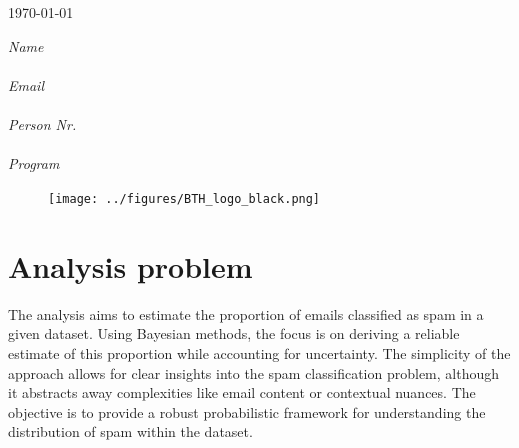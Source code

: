 \documentclass[12pt,a4paper]{article}
\begin{document}
\vspace*{3cm}

\begin{center}
    \Huge\textbf{\doctitle}\\
    \Large\textbf{\docsubtitle}
    \\\vspace*{5mm} 
    \large\today                            
\end{center} 

\vspace*{1cm}
\begin{center}
    \textit{Name}       \\
    \authorname         \\ %
    \vspace*{2mm}
    \textit{Email}      \\
    \authormail         \\ %
    \vspace*{2mm}
    \textit{Person Nr.} \\
    \authorpersonnr     \\ %
    \vspace*{2mm}
    \textit{Program}    \\
    \program               %
\end{center}

\begin{figure}[!b]
    \centering
    \texttt{[image: ../figures/BTH\_logo\_black.png]}
\end{figure}

\newpage

\section{Analysis problem}\label{sec:analysisproblem}

The analysis aims to estimate the proportion of emails classified as spam in a given dataset. Using Bayesian
methods, the focus is on deriving a reliable estimate of this proportion while accounting for uncertainty.
The simplicity of the approach allows for clear insights into the spam classification problem, although it
abstracts away complexities like email content or contextual nuances. The objective is to provide a robust
probabilistic framework for understanding the distribution of spam within the dataset.
\end{document}
